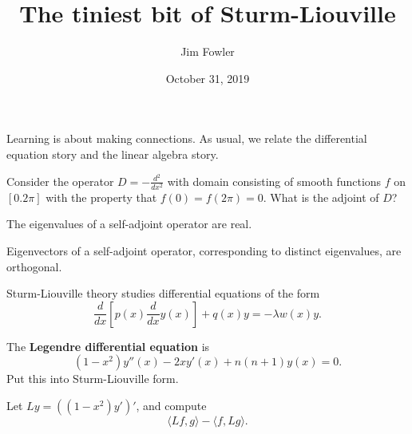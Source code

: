 \documentclass{homework}
\author{Jim Fowler}
\title{The tiniest bit of Sturm-Liouville}
\date{October 31, 2019}
\begin{document}
\maketitle

Learning is about making connections.  As usual, we relate the
differential equation story and the linear algebra story.

\begin{problem}
  Consider the operator $D = -\frac{d^2}{dx^2}$ with domain consisting
  of smooth functions $f$ on $[0.2\pi]$ with the property that
  $f(0) = f(2\pi) = 0$.  What is the adjoint of $D$?
\end{problem}

\vfill

\begin{problem}
  The eigenvalues of a self-adjoint operator are real.
\end{problem}

\vfill

\begin{problem}
  Eigenvectors of a self-adjoint operator, corresponding to distinct eigenvalues, are orthogonal.
\end{problem}

\vfill

\begin{problem}
  Sturm-Liouville theory studies differential equations of the form
\[
  \frac{d}{dx} \left[p(x){ \frac{d}{dx} y(x) }\right]+q(x)y=-\lambda w(x)y.
\]

  The \textbf{Legendre differential equation} is
  \[
    (1-x^2) y''(x) - 2x y'(x) + n(n+1) y(x) = 0.
  \]
  Put this into Sturm-Liouville form.
\end{problem}

\vfill

\begin{problem}
  Let $Ly = \left( (1-x^2) y' \right)'$, and compute
  \[
    \langle Lf, g \rangle - \langle f, Lg \rangle.
  \]
\end{problem}

\vfill
\end{document}
